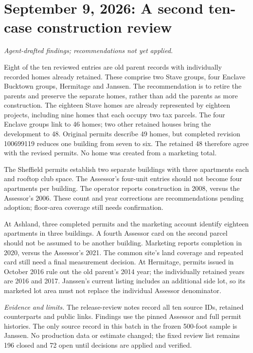 \clearpage
\section*{September 9, 2026: A second ten-case construction review}
\textit{Agent-drafted findings; recommendations not yet applied.}

Eight of the ten reviewed entries are old parent records with individually recorded homes already retained. These comprise two Stave groups, four Enclave Bucktown groups, Hermitage and Janssen. The recommendation is to retire the parents and preserve the separate homes, rather than add the parents as more construction. The eighteen Stave homes are already represented by eighteen projects, including nine homes that each occupy two tax parcels. The four Enclave groups link to 46 homes; two other retained houses bring the development to 48. Original permits describe 49 homes, but completed revision 100699119 reduces one building from seven to six. The retained 48 therefore agree with the revised permits. No home was created from a marketing total.

The Sheffield permits establish two separate buildings with three apartments each and rooftop club space. The Assessor's four-unit entries should not become four apartments per building. The operator reports construction in 2008, versus the Assessor's 2006. These count and year corrections are recommendations pending adoption; floor-area coverage still needs confirmation.

At Ashland, three completed permits and the marketing account identify eighteen apartments in three buildings. A fourth Assessor card on the second parcel should not be assumed to be another building. Marketing reports completion in 2020, versus the Assessor's 2021. The common site's land coverage and repeated card still need a final measurement decision. At Hermitage, permits issued in October 2016 rule out the old parent's 2014 year; the individually retained years are 2016 and 2017. Janssen's current listing includes an additional side lot, so its marketed lot area must not replace the individual Assessor denominator.

\medskip
\noindent\textit{Evidence and limits.} The release-review notes record all ten source IDs, retained counterparts and public links. Findings use the pinned Assessor and full permit histories. The only source record in this batch in the frozen 500-foot sample is Janssen. No production data or estimate changed; the fixed review list remains 196 closed and 72 open until decisions are applied and verified.

